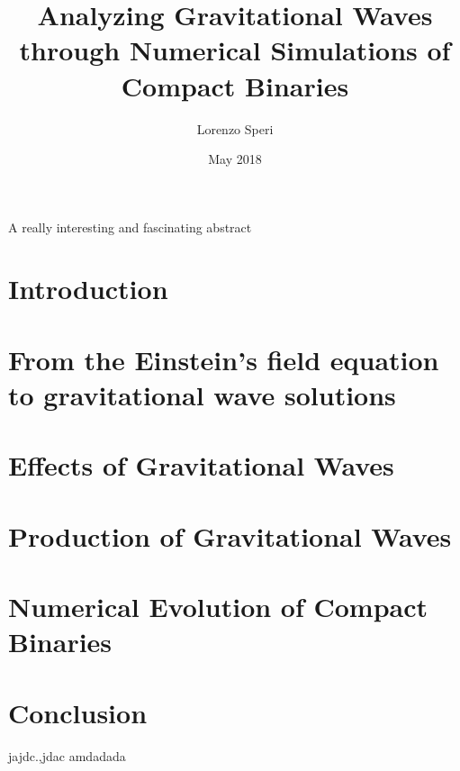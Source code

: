 \documentclass[twoside,english, a4paper, 12pt]{shared/uiofysmaster}
\author{Lorenzo Speri}
\title{\bf{Analyzing Gravitational Waves through Numerical Simulations of Compact Binaries}}
\date{May 2018}
\begin{document}

\maketitle
\clearpage

\tableofcontents
\clearpage

\begin{abstract1}
A really interesting and fascinating abstract
\end{abstract1}

\clearpage
\section{Introduction}


\clearpage
\section{From the Einstein's field equation\\ to gravitational wave solutions}
\label{from_equation_to_solution}


\clearpage
\section{Effects of Gravitational Waves}
\label{effects_gw}


\clearpage
\section{Production of Gravitational Waves}
\label{production_gw}


\clearpage
\section{Numerical Evolution of Compact Binaries}
\label{numerical_evolution}


\clearpage
\section{Conclusion}


\clearpage


%
jajdc.,jdac amdadada
\cite{taniguchiVariousFeaturesQuasiequilibrium2003}

%

\printbibliography


\end{document}
